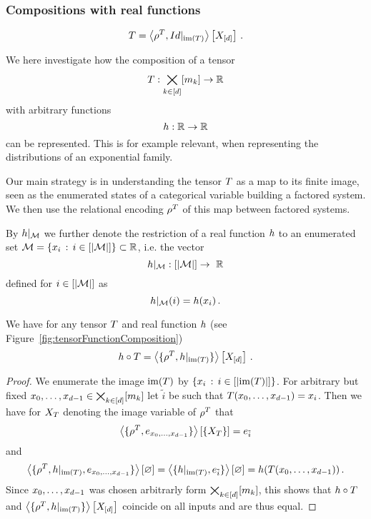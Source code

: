 \subsubsection{Compositions with real functions}

	\[ T = \left\langle \rho^{T}, {Id}|_{\mathrm{im}\left(T\right)} \right\rangle \left[ X_{[d]} \right] \, . \]

We here investigate how the composition of a tensor 
	\[ T : \bigtimes_{k\in[d]}[m_{k}] \rightarrow \mathbb{R} \]
with arbitrary functions 
	\[ h: \mathbb{R} \rightarrow \mathbb{R} \]
can be represented.
This is for example relevant, when representing the distributions of an exponential family.

Our main strategy is in understanding the tensor $T$ as a map to its finite image, seen as the enumerated states of a categorical variable building a factored system.
We then use the relational encoding $\rho^{T}$ of this map between factored systems. 

By ${h}|_{\mathcal{M}}$ we further denote the restriction of a real function $h$ to an enumerated set $\mathcal{M} =\{x_i \, : \, i \in [\left|\mathcal{M}\right|]\} \subset \mathbb{R}$, i.e. the vector
	\[ \restrictionofto{\chainingfunction}{\mathcal{M}} : [\cardof{\mathcal{M}}] \rightarrow \rr \]
defined for $i \in [\left|\mathcal{M}\right|]$ as
	\[ {h}|_{\mathcal{M}}(i) = h(x_i) \, . \]


\begin{theorem}\label{the:tensorFunctionComposition}
	We have for any tensor $T$ and real function $h$ (see Figure~\ref{fig:tensorFunctionComposition})
		\[ h\circ T = \left\langle \{\rho^{T}, {h}|_{\mathrm{im}\left(T\right)}\}\right\rangle \left[ X_{[d]} \right] \, . \]
\end{theorem}
\begin{proof}
	We enumerate the image $\mathrm{im}(T)$ by $\{x_i \, : \, i \in [\left|\mathrm{im}(T)\right|]\}$.
	For arbitrary but fixed $x_{0},\ldots,x_{d-1}\in\bigtimes_{k\in[d]}[m_{k}]$ let $\tilde{i}$ be such that $T(x_{0},\ldots,x_{d-1}) = x_i$.
	Then we have for $X_{T}$ denoting the image variable of $\rho^{T}$ that
		\[ \left\langle \{\rho^{T},e_{x_{0},\ldots,x_{d-1}}\}\right\rangle \left[ \{X_{T}\} \right] = e_{\tilde{i}} \]
	and
		\[ \left\langle \{\rho^{T}, {h}|_{\mathrm{im}\left(T\right)}, e_{x_{0},\ldots,x_{d-1}}\}\right\rangle \left[ \varnothing \right] = 
		\left\langle \{{h}|_{\mathrm{im}\left(T\right)}, e_{\tilde{i}}\}\right\rangle \left[ \varnothing \right] = 
		h(T(x_{0},\ldots,x_{d-1})) \, . 
		\]
	Since $x_{0},\ldots,x_{d-1}$ was chosen arbitrarly form $\bigtimes_{k\in[d]}[m_{k}]$, this shows that $h\circ T$ and $ \left\langle \{\rho^{T}, {h}|_{\mathrm{im}\left(T\right)}\}\right\rangle \left[ X_{[d]} \right]$ coincide on all inputs and are thus equal.
\end{proof}


